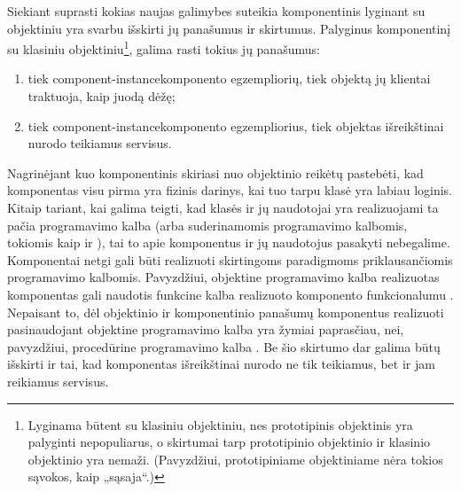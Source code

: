 Siekiant suprasti kokias naujas galimybes suteikia komponentinis
lyginant su objektiniu yra svarbu išskirti jų panašumus ir skirtumus.
Palyginus komponentinį su klasiniu objektiniu\footnote{Lyginama
būtent su klasiniu objektiniu, nes prototipinis objektinis yra
palyginti nepopuliarus, o skirtumai tarp prototipinio objektinio
ir klasinio objektinio yra nemaži. (Pavyzdžiui, prototipiniame
objektiniame nėra tokios sąvokos, kaip „sąsaja“.)}, galima rasti
tokius jų panašumus:
\begin{enumerate}
  \item tiek \gls{component-instance}{komponento egzempliorių}, tiek
    objektą jų klientai traktuoja, kaip juodą dėžę;
  \item tiek \gls{component-instance}{komponento egzempliorius}, tiek
    objektas išreikštinai nurodo teikiamus servisus.
\end{enumerate}

Nagrinėjant kuo komponentinis skiriasi nuo objektinio reikėtų
pastebėti, kad komponentas visu pirma yra fizinis darinys, kai tuo
tarpu klasė yra labiau loginis. Kitaip tariant, kai galima teigti,
kad klasės ir jų naudotojai yra realizuojami ta pačia programavimo
kalba (arba suderinamomis programavimo kalbomis, tokiomis kaip
 ir ), tai to apie komponentus ir jų
naudotojus pasakyti nebegalime. Komponentai netgi gali būti realizuoti
skirtingoms paradigmoms priklausančiomis programavimo kalbomis.
Pavyzdžiui, objektine programavimo kalba realizuotas komponentas gali
naudotis funkcine kalba realizuoto komponento
funkcionalumu \cite[36]{heineman2001component}. Nepaisant to,
dėl objektinio ir komponentinio panašumų komponentus realizuoti
pasinaudojant objektine programavimo kalba yra žymiai paprasčiau,
nei, pavyzdžiui, procedūrine programavimo kalba \cite{what-to-compose}.
Be šio skirtumo dar galima būtų išskirti ir tai, kad komponentas
išreikštinai nurodo ne tik teikiamus, bet ir jam reikiamus
servisus.
